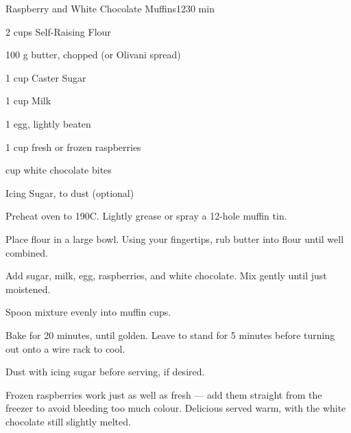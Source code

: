 \begin{recipebox}{Raspberry and White Chocolate Muffins}{12}{30 min}
\begin{ingredients}
  \item 2  cups Self-Raising Flour
  \item 100 g butter, chopped (or Olivani spread)
  \item 1 cup Caster Sugar
  \item 1 cup Milk
  \item 1 egg, lightly beaten
  \item 1 cup fresh or frozen raspberries
  \item {} cup white chocolate bites
  \item Icing Sugar, to dust (optional)
\end{ingredients}

\begin{method}
  \item Preheat oven to 190\degree C. Lightly grease or spray a 12-hole muffin tin.
  \item Place flour in a large bowl. Using your fingertips, rub butter into flour until well combined.
  \item Add sugar, milk, egg, raspberries, and white chocolate. Mix gently until just moistened.
  \item Spoon mixture evenly into muffin cups.
  \item Bake for 20 minutes, until golden. Leave to stand for 5 minutes before turning out onto a wire rack to cool.
  \item Dust with icing sugar before serving, if desired.
\end{method}

\begin{notes}
Frozen raspberries work just as well as fresh — add them straight from the freezer to avoid bleeding too much colour.  
Delicious served warm, with the white chocolate still slightly melted.  
\end{notes}
\end{recipebox}

